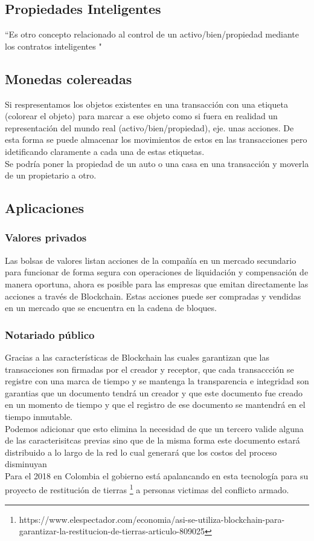 \subsection{Propiedades Inteligentes}
``Es otro concepto relacionado al control de un activo/bien/propiedad mediante los contratos inteligentes "
\citep{crosby2016blockchain}

\subsection{Monedas colereadas}
Si respresentamos los objetos existentes en una transacción con una etiqueta (colorear el objeto) para marcar a ese objeto como si fuera en realidad un representación del mundo real (activo/bien/propiedad), eje. unas acciones.
De esta forma se puede almacenar los movimientos de estos en las transacciones pero idetificando claramente a cada una de estas etiquetas.
\\
Se podría poner la propiedad de un auto o una casa en una transacción y moverla de un propietario a otro. \citep{crosby2016blockchain}



\subsection{Aplicaciones}

\subsubsection{Valores privados}
Las bolsas de valores listan acciones de la compañía en un mercado secundario para funcionar de forma segura con operaciones de liquidación y compensación de manera oportuna, ahora es posible para las empresas que emitan directamente las acciones a través de Blockchain. Estas acciones puede ser compradas y vendidas en un mercado que se encuentra en la cadena de bloques. \citep{crosby2016blockchain}

\subsubsection{Notariado público}
Gracias a las características de Blockchain las cuales garantizan que las transacciones son firmadas por el creador y receptor, que cada transaccción se registre con una marca de tiempo y se mantenga la transparencia e integridad son garantias que un documento  tendrá un creador y que este documento fue creado en un momento de tiempo y que el registro de ese documento se mantendrá en el tiempo inmutable. \citep{zheng2016blockchain}
\\Podemos adicionar que esto elimina la necesidad de que un tercero valide alguna de las caracterisitcas previas sino que de la misma forma este documento estará distribuido a lo largo de la red lo cual generará que los costos del proceso disminuyan \citep{crosby2016blockchain}
\\
Para el 2018 en Colombia el gobierno está apalancando en esta tecnología para su proyecto de restitución de tierras \footnote{https://www.elespectador.com/economia/asi-se-utiliza-blockchain-para-garantizar-la-restitucion-de-tierras-articulo-809025} a personas victimas del conflicto armado.

